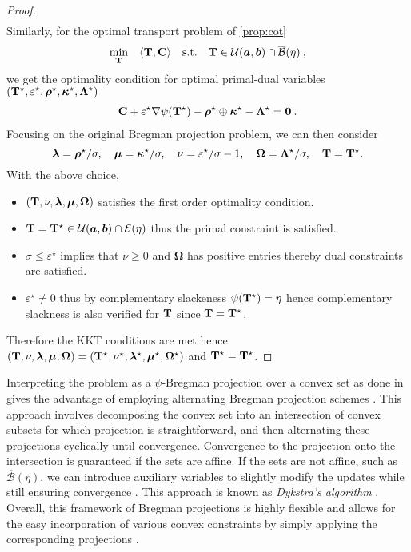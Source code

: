 \begin{proof}
\begin{align}
    \end{align}
    Similarly, for the optimal transport problem of \eqref{prop:cot}
    \begin{align}
        \min_{{\mathbf{T}}} \quad \langle {\mathbf{T}}, {\mathbf{C}} \rangle \quad \text{s.t.} \quad  {\mathbf{T}} \in {\mathcal{U}}(\bm{a}, \bm{b}) \cap \overline{\mathcal{B}}(\eta) \:,
    \end{align}
    we get the optimality condition for optimal primal-dual variables $({\mathbf{T}}^\star, \varepsilon^\star, \bm{\rho}^\star, \bm{\kappa}^\star, \mathbf{\Lambda}^\star)$
    \begin{align}
        \mathbf{C} + \varepsilon^\star \nabla \psi({\mathbf{T}}^\star) -  \bm{\rho}^\star \oplus \bm{\kappa}^{\star} - \mathbf{\Lambda}^\star = \bm{0} \:.
    \end{align}
    Focusing on the original Bregman projection problem, we can then consider
    \[
    \bm{\lambda} = \bm{\rho}^\star / \sigma, \quad \bm{\mu} = \bm{\kappa}^\star / \sigma, \quad \nu = \varepsilon^\star / \sigma - 1, \quad \mathbf{\Omega} = \mathbf{\Lambda}^\star / \sigma, \quad {\mathbf{T}} = {\mathbf{T}}^\star.
    \]
    With the above choice, 
    \begin{itemize}
        \item  $({\mathbf{T}}, \nu, \bm{\lambda}, \bm{\mu}, \mathbf{\Omega})$ satisfies the first order optimality condition.
        \item ${\mathbf{T}} = {\mathbf{T}}^\star \in {\mathcal{U}}(\bm{a}, \bm{b}) \cap \mathcal{E}(\eta)$ thus the primal constraint is satisfied. 
        \item $\sigma \leq \varepsilon^\star$ implies that $\nu \geq 0$ and $\mathbf{\Omega}$ has positive entries thereby dual constraints are satisfied. 
        \item $\varepsilon^\star \neq 0$ thus by complementary slackeness $\psi({\mathbf{T}}^\star) = \eta$ hence complementary slackness is also verified for ${\mathbf{T}}$ since ${\mathbf{T}} = {\mathbf{T}}^\star$.
    \end{itemize}
    Therefore the KKT conditions are met hence $({\mathbf{T}}, \nu, \bm{\lambda}, \bm{\mu}, \mathbf{\Omega}) = ({\mathbf{T}}^\star, \nu^\star, \bm{\lambda}^\star, \bm{\mu}^\star, \mathbf{\Omega}^\star)$ and ${\mathbf{T}}^\star = {\mathbf{T}}^\star$.
\end{proof}

Interpreting the problem as a $\psi$-Bregman projection over a convex set as done in  gives the advantage of employing alternating Bregman projection schemes \citep{benamou2015iterative}. This approach involves decomposing the convex set into an intersection of convex subsets for which projection is straightforward, and then alternating these projections cyclically until convergence. Convergence to the projection onto the intersection is guaranteed if the sets are affine. If the sets are not affine, such as $\overline{\mathcal{B}}(\eta)$, we can introduce auxiliary variables to slightly modify the updates while still ensuring convergence \citep{censor1998dykstra}. This approach is known as \emph{Dykstra's algorithm} \citep{dykstra1983algorithm}. Overall, this framework of Bregman projections is highly flexible and allows for the easy incorporation of various convex constraints by simply applying the corresponding projections \citep{benamou2015iterative}.

